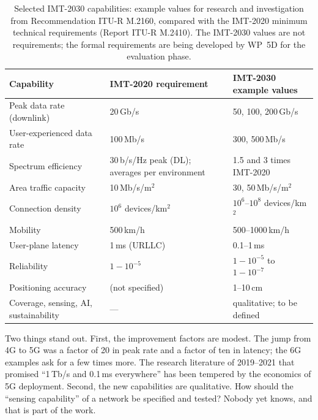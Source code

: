 \begin{table}[htbp]\centering\small
\caption{Selected IMT-2030 capabilities: example values for research and investigation from
Recommendation ITU-R M.2160, compared with the IMT-2020 minimum technical requirements (Report ITU-R
M.2410). The IMT-2030 values are not requirements; the formal requirements are being developed by
WP~5D for the evaluation phase.}
\label{tab:ch25:kpi}
\begin{tabularx}{\linewidth}{@{}X l l@{}}
\toprule
Capability & IMT-2020 requirement & IMT-2030 example values\\
\midrule
Peak data rate (downlink) & 20\,Gb/s & 50, 100, 200\,Gb/s\\
User-experienced data rate & 100\,Mb/s & 300, 500\,Mb/s\\
Spectrum efficiency & 30\,b/s/Hz peak (DL); averages per environment & 1.5 and 3 times IMT-2020\\
Area traffic capacity & 10\,Mb/s/m$^2$ & 30, 50\,Mb/s/m$^2$\\
Connection density & $10^6$ devices/km$^2$ & $10^6$--$10^8$ devices/km$^2$\\
Mobility & 500\,km/h & 500--1000\,km/h\\
User-plane latency & 1\,ms (URLLC) & 0.1--1\,ms\\
Reliability & $1-10^{-5}$ & $1-10^{-5}$ to $1-10^{-7}$\\
Positioning accuracy & (not specified) & 1--10\,cm\\
Coverage, sensing, AI, sustainability & --- & qualitative; to be defined\\
\bottomrule
\end{tabularx}
\end{table}


Two things stand out. First, the improvement factors are modest. The jump from 4G to 5G was a factor of
20 in peak rate and a factor of ten in latency; the 6G examples ask for a few times more. The research
literature of 2019--2021 that promised ``1\,Tb/s and 0.1\,ms everywhere'' has been tempered by the
economics of 5G deployment. Second, the new capabilities are qualitative. How should the ``sensing
capability'' of a network be specified and tested? Nobody yet knows, and that is part of the work.

